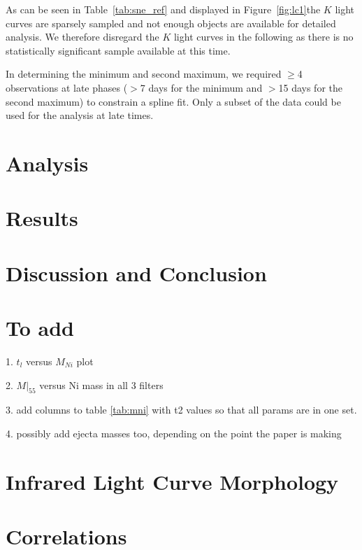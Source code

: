\documentclass[useAMS,usenatbib ]{mn2e}
\begin{document}
As can be seen in Table~\ref{tab:sne_ref} and displayed in
Figure~\ref{fig:lc1}the $K$ light curves are sparsely sampled  and
not enough objects are available for detailed analysis. We therefore 
disregard the $K$ light curves in the following as there is no
statistically significant sample available at this time.

In determining the  
minimum and second maximum, we required $\geq$4
observations at late phases ($>$7 days for the minimum and $>$15 days
for the second maximum) to constrain a spline fit. Only a subset
of the data could be used for the analysis at late times.
\fi
\section{Analysis}
\label{sec-ana}


\section{Results}
\label{sec-res}


\section{Discussion and Conclusion}
\label{sec-dnc}

\section{To add}
1. $t_l$ versus $M_{Ni}$ plot


2. $M|_{55}$ versus Ni mass in all 3 filters


3. add columns to table \ref{tab:mni} with t2 values so that all params are in one set.



4. possibly add ejecta masses too, depending on the point the paper is making

\iffalse
\section{Infrared Light Curve Morphology}
\label{sec-LC}


\section{Correlations}
\label{sec-corr}

\end{document}
